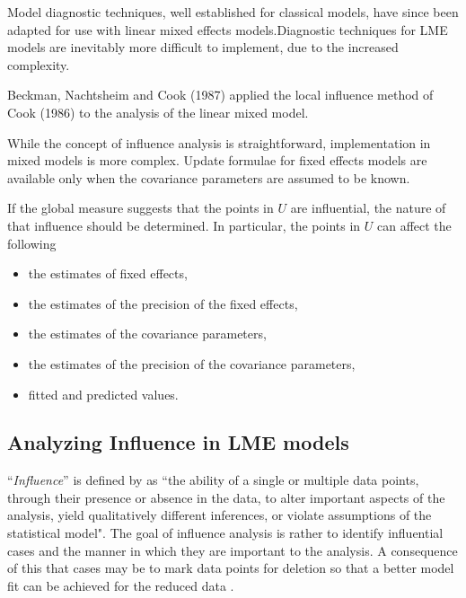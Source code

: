 \documentclass[12pt, a4paper]{report}
\theoremstyle{plain}
\theoremstyle{definition}
\theoremstyle{remark}
\begin{document}
Model diagnostic techniques, well established for classical models, have since been adapted for use with linear mixed effects models.Diagnostic techniques for LME models are inevitably more difficult to implement, due to the increased complexity.

Beckman, Nachtsheim and Cook (1987) \citet{Beckman} applied the local influence method of Cook (1986) to the analysis of the linear mixed model.

While the concept of influence analysis is straightforward, implementation in mixed models is more complex. Update formulae for fixed effects models are available only when the covariance parameters are assumed to be known.

If the global measure suggests that the points in $U$ are influential, the nature of that influence should be determined. In particular, the points in $U$ can affect the following

\begin{itemize}
	\item the estimates of fixed effects,
	\item the estimates of the precision of the fixed effects,
	\item the estimates of the covariance parameters,
	\item the estimates of the precision of the covariance parameters,
	\item fitted and predicted values.
\end{itemize}


\subsection{Analyzing Influence in LME models}
``\textit{Influence}” is defined by \citet{schab} as ``the ability of a single or multiple data points, through their presence
or absence in the data, to alter important aspects of the analysis, yield qualitatively different inferences, or
violate assumptions of the statistical model". The goal of influence analysis is rather to identify influential cases and the manner in
which they are important to the analysis. A consequence of this that cases may be to mark data
points for deletion so that a better model fit can be achieved for the reduced data \citep{schab}.  

\end{document}
